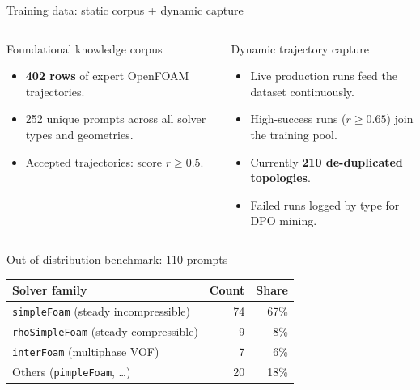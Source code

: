 \documentclass[aspectratio=169,10pt]{beamer}
\begin{document}
\begin{frame}{Training data: static corpus + dynamic capture}
\begin{columns}[T,onlytextwidth]
\begin{block}{Foundational knowledge corpus}
\begin{itemize}\small
  \item \textbf{402 rows} of expert OpenFOAM trajectories.
  \item 252 unique prompts across all solver types and geometries.
  \item Accepted trajectories: score $r\ge0.5$.
\end{itemize}
\end{block}
\begin{block}{Dynamic trajectory capture}
\begin{itemize}\small
  \item Live production runs feed the dataset continuously.
  \item High-success runs ($r\ge0.65$) join the training pool.
  \item Currently \textbf{210 de-duplicated topologies}.
  \item Failed runs logged by type for DPO mining.
\end{itemize}
\end{block}
\end{columns}
\vspace{0.05cm}
\begin{exampleblock}{Out-of-distribution benchmark: 110 prompts}
\centering\footnotesize
\begin{tabular}{lrr}
\toprule
\textbf{Solver family} & \textbf{Count} & \textbf{Share} \\
\midrule
\texttt{simpleFoam} (steady incompressible) & 74 & 67\% \\
\texttt{rhoSimpleFoam} (steady compressible) & 9 & 8\% \\
\texttt{interFoam} (multiphase VOF) & 7 & 6\% \\
Others (\texttt{pimpleFoam}, \dots) & 20 & 18\% \\
\bottomrule
\end{tabular}
\end{exampleblock}
\end{frame}
\end{document}
